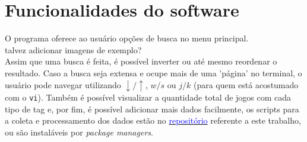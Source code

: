 \documentclass[ecp,tc]{iiufrgs}
\begin{document}
\chapter{Funcionalidades do software}
O programa oferece ao usuário opções de busca no menu principal. \\talvez adicionar imagens de exemplo?\\ Assim que uma busca é feita, é possível inverter ou até mesmo reordenar o resultado. Caso a busca seja extensa e ocupe mais de uma 'página' no terminal, o usuário pode navegar utilizando $\downarrow/\uparrow$, $w/s$ ou $j/k$ (para quem está acostumado com o \texttt{vi}).
Também é possível visualizar a quantidade total de jogos com cada tipo de tag e, por fim, é possível adicionar mais dados facilmente, os scripts para a coleta e processamento dos dados estão no \href{https://github.com/Julioau/SteamingSort}{\textcolor{blue}{repositório}} referente a este trabalho, ou são instaláveis por \textit{package managers}.


\end{document}
